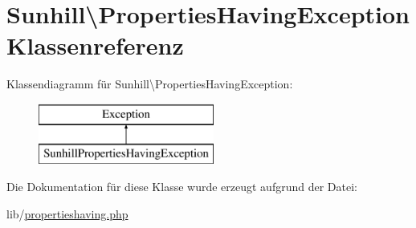 \hypertarget{classSunhill_1_1PropertiesHavingException}{}\section{Sunhill\textbackslash{}Properties\+Having\+Exception Klassenreferenz}
\label{classSunhill_1_1PropertiesHavingException}
Klassendiagramm für Sunhill\textbackslash{}Properties\+Having\+Exception\+:\begin{figure}[H]
\begin{center}
\leavevmode
\includegraphics[height=2.000000cm]{d9/d56/classSunhill_1_1PropertiesHavingException}
\end{center}
\end{figure}


Die Dokumentation für diese Klasse wurde erzeugt aufgrund der Datei\+:\begin{DoxyCompactItemize}
\item 
lib/\hyperlink{propertieshaving_8php}{propertieshaving.\+php}\end{DoxyCompactItemize}
